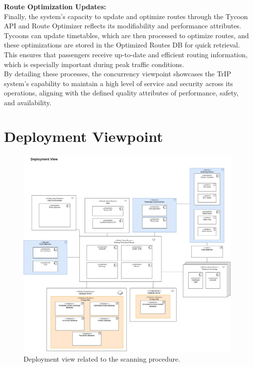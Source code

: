 \noindent \textbf{Route Optimization Updates:} \\
Finally, the system’s capacity to update and optimize routes through the Tycoon API and Route Optimizer reflects its modifiability and performance attributes. Tycoons can update timetables, which are then processed to optimize routes, and these optimizations are stored in the Optimized Routes DB for quick retrieval. This ensures that passengers receive up-to-date and efficient routing information, which is especially important during peak traffic conditions. \\

By detailing these processes, the concurrency viewpoint showcases the TrIP system's capability to maintain a high level of service and security across its operations, aligning with the defined quality attributes of performance, safety, and availability.

\section{Deployment Viewpoint}

\begin{figure}[H]
    \centering
    \includegraphics[width=\textwidth]{drawings/views_final_version/deployment_view.png}
    \caption{Deployment view related to the scanning procedure.}
    \label{fig:deployment_view_scanning}
\end{figure}

